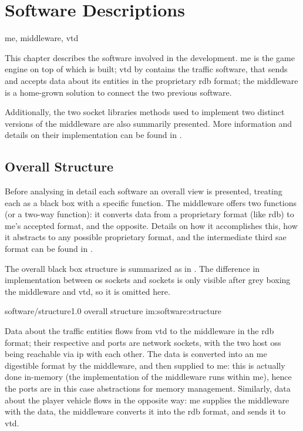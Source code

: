 \chapter{Software Descriptions}\label{ch:software}

\begin{keywords}
	me, middleware, vtd
\end{keywords}

This chapter describes the software involved in the development. \gls{me} is the game engine on top of which  is built; \gls{vtd} by  contains the traffic software, that sends and accepts data about its entities in the proprietary \gls{rdb} format; the \gls{middleware} is a home-grown solution to connect the two previous software.

Additionally, the two socket libraries methods used to implement two distinct versions of the \gls{middleware} are also summarily presented. More information and details on their implementation can be found in .

\section{Overall Structure}\label{sc:software:overall}

Before analysing in detail each software an overall view is presented, treating each as a black box with a specific function. The \gls{middleware} offers two functions (or a two-way function): it converts data from a proprietary format (like \gls{rdb}) to \gls{me}'s accepted format, and the opposite. Details on how it accomplishes this, how it abstracts to any possible proprietary format, and the intermediate third \gls{sae} format can be found in .



The overall black box structure is summarized as in . The difference in implementation between \gls{os} sockets and  sockets is only visible after grey boxing the \gls{middleware} and \gls{vtd}, so it is omitted here.

\begin{image}
	{software/structure}{1.0}
	{overall structure}
	{im:software:structure}
	{}
\end{image}

Data about the traffic entities flows from \gls{vtd} to the \gls{middleware} in the \gls{rdb} format; their respective  and  ports are network sockets, with the two host \glspl{os} being reachable via \gls{ip} with each other. The data is converted into an \gls{me} digestible format by the \gls{middleware}, and then supplied to \gls{me}: this is actually done in-memory (the implementation of the \gls{middleware} runs within \gls{me}), hence the ports are in this case abstractions for memory management. Similarly, data about the player vehicle flows in the opposite way: \gls{me} supplies the \gls{middleware} with the data, the \gls{middleware} converts it into the \gls{rdb} format, and sends it to \gls{vtd}.

